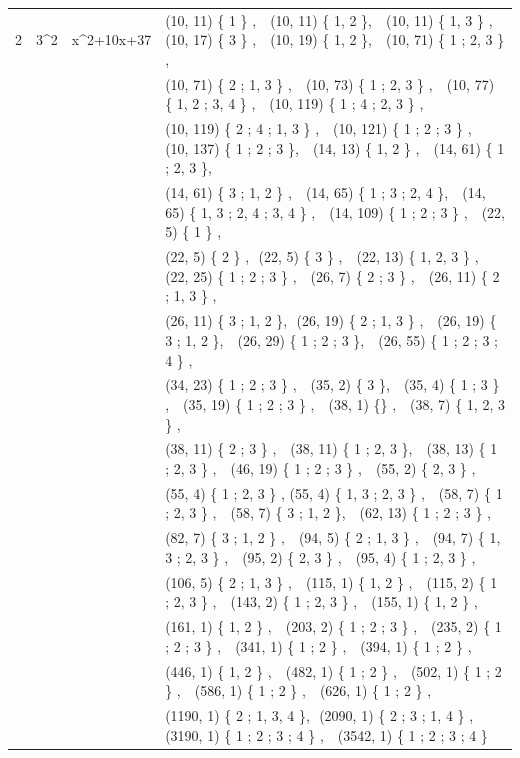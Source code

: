 \documentclass[11pt,reqno]{amsart}
\theoremstyle{definition}
\begin{document}
{\begin{longtable}{MMMM}
 2 & 3^2 & x^2+10x+37 & (10, 11) \{ 1 \} , \,\,  (10, 11) \{ 1, 2 \}, \,\,  (10, 11) \{ 1, 3 \} , \,\,  (10, 17) \{ 3 \}  , \,\,   (10, 19) \{ 1, 2 \}, \,\, (10, 71) \{ 1 ; 2, 3 \} , \\
  & & & (10, 71) \{ 2 ; 1, 3 \} , \,\,  (10, 73) \{ 1 ; 2, 3 \} , \,\,  (10, 77) \{ 1, 2 ; 3, 4 \} , \,\,  (10, 119) \{ 1 ; 4 ; 2, 3 \} ,  \\
  & & &  (10, 119) \{ 2 ; 4 ; 1, 3 \} ,  \,\,  (10, 121) \{ 1 ; 2 ; 3 \} , \,\,  (10, 137) \{ 1 ; 2 ; 3 \}, \,\,  (14, 13) \{ 1, 2 \} , \,\, (14, 61) \{ 1 ; 2, 3 \}, \\
  & & &  (14, 61) \{ 3 ; 1, 2 \} , \,\,  (14, 65) \{ 1 ; 3 ; 2, 4 \}, \,\,  (14, 65) \{ 1, 3 ; 2, 4 ; 3, 4 \} , \,\,  (14, 109) \{ 1 ; 2 ; 3 \} , \,\, (22, 5) \{ 1 \} , \\
  & & &  (22, 5) \{ 2 \}  ,\,\, (22, 5) \{ 3 \}  , \,\, (22, 13) \{ 1, 2, 3 \} , \,\, (22, 25) \{ 1 ; 2 ; 3 \} ,  \,\,  (26, 7) \{ 2 ; 3 \} , \,\,  (26, 11) \{ 2 ; 1, 3 \} ,   \\
  & & &   (26, 11) \{ 3 ; 1, 2 \},\,\, (26, 19) \{ 2 ; 1, 3 \} , \,\, (26, 19) \{ 3 ; 1, 2 \}, \,\,  (26, 29) \{ 1 ; 2 ; 3 \}, \,\,  (26, 55) \{ 1 ; 2 ; 3 ; 4 \} , \\
  & & &  (34, 23) \{ 1 ; 2 ; 3 \} , \,\,  (35, 2) \{ 3 \}, \,\, (35, 4) \{ 1 ; 3 \} , \,\,  (35, 19) \{ 1 ; 2 ; 3 \} , \,\, (38, 1) \{\} , \,\, (38, 7) \{ 1, 2, 3 \} ,  \\
  & & &  (38, 11) \{ 2 ; 3 \} , \,\, (38, 11) \{ 1 ; 2, 3 \}, \,\,   (38, 13) \{ 1 ; 2, 3 \} , \,\,   (46, 19) \{ 1 ; 2 ; 3 \} , \,\, (55, 2) \{ 2, 3 \} ,  \\
  & & &    (55, 4) \{ 1 ; 2, 3 \} , (55, 4) \{ 1, 3 ; 2, 3 \}  , \,\, (58, 7) \{ 1 ; 2, 3 \}  , \,\,  (58, 7) \{ 3 ; 1, 2 \}, \,\,  (62, 13) \{ 1 ; 2 ; 3 \} ,  \\
  & & &  (82, 7) \{ 3 ; 1, 2 \} , \,\,  (94, 5) \{ 2 ; 1, 3 \} , \,\,  (94, 7) \{ 1, 3 ; 2, 3 \} , \,\,  (95, 2) \{ 2, 3 \} , \,\,  (95, 4) \{ 1 ; 2, 3 \} ,  \\
  & & &   (106, 5) \{ 2 ; 1, 3 \} , \,\, (115, 1) \{ 1, 2 \} , \,\, (115, 2) \{ 1 ; 2, 3 \} , \,\, (143, 2) \{ 1 ; 2, 3 \} , \,\,  (155, 1) \{ 1, 2 \} , \\
  & & &    (161, 1) \{ 1, 2 \} , \,\, (203, 2) \{ 1 ; 2 ; 3 \} , \,\,   (235, 2) \{ 1 ; 2 ; 3 \} , \,\, (341, 1) \{ 1 ; 2 \} , \,\,  (394, 1) \{ 1 ; 2 \} ,  \\
  & & &  (446, 1) \{ 1, 2 \} , \,\, (482, 1) \{ 1 ; 2 \} , \,\,  (502, 1) \{ 1 ; 2 \} , \,\,  (586, 1) \{ 1 ; 2 \} ,  \,\,  (626, 1) \{ 1 ; 2 \}  ,  \\
  & & &  (1190, 1) \{ 2 ; 1, 3, 4 \},\,\,  (2090, 1) \{ 2 ; 3 ; 1, 4 \} , \,\,  (3190, 1) \{ 1 ; 2 ; 3 ; 4 \} , \,\,  (3542, 1) \{ 1 ; 2 ; 3 ; 4 \}  \\
  \midrule 
  

\end{longtable}}
\end{document}
